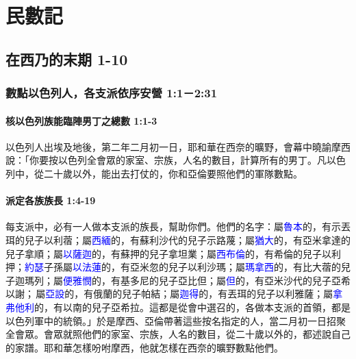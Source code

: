 \chapter{民數記}

\section{在西乃的末期 1-10}

\subsection{數點以色列人，各支派依序安營 1:1－2:31}
\subsubsection{核以色列族能臨陣男丁之總數 1:1-3}
以色列人出埃及地後，第二年二月初一日，耶和華在西奈的曠野，會幕中曉諭摩西說：「你要按以色列全會眾的家室、宗族，人名的數目，計算所有的男丁。凡以色列中，從二十歲以外，能出去打仗的，你和亞倫要照他們的軍隊數點。

\subsubsection{派定各族族長 1:4-19}
每支派中，必有一人做本支派的族長，幫助你們。他們的名字：屬\textcolor{blue}{魯本}的，有示丟珥的兒子以利蓿；屬\textcolor{blue}{西緬}的，有蘇利沙代的兒子示路蔑；屬\textcolor{blue}{猶大}的，有亞米拿達的兒子拿順；屬\textcolor{blue}{以薩迦}的，有蘇押的兒子拿坦業；屬\textcolor{blue}{西布倫}的，有希倫的兒子以利押；\textcolor{blue}{約瑟}子孫屬\textcolor{blue}{以法蓮}的，有亞米忽的兒子以利沙瑪；屬\textcolor{blue}{瑪拿西}的，有比大蓿的兒子迦瑪列；屬\textcolor{blue}{便雅憫}的，有基多尼的兒子亞比但；屬\textcolor{blue}{但}的，有亞米沙代的兒子亞希以謝； 屬\textcolor{blue}{亞設}的，有俄蘭的兒子帕結；屬\textcolor{blue}{迦得}的，有丟珥的兒子以利雅薩；屬\textcolor{blue}{拿弗他利}的，有以南的兒子亞希拉。這都是從會中選召的，各做本支派的首領，都是以色列軍中的統領。」於是摩西、亞倫帶著這些按名指定的人，當二月初一日招聚全會眾。會眾就照他們的家室、宗族，人名的數目，從二十歲以外的，都述說自己的家譜。耶和華怎樣吩咐摩西，他就怎樣在西奈的曠野數點他們。

